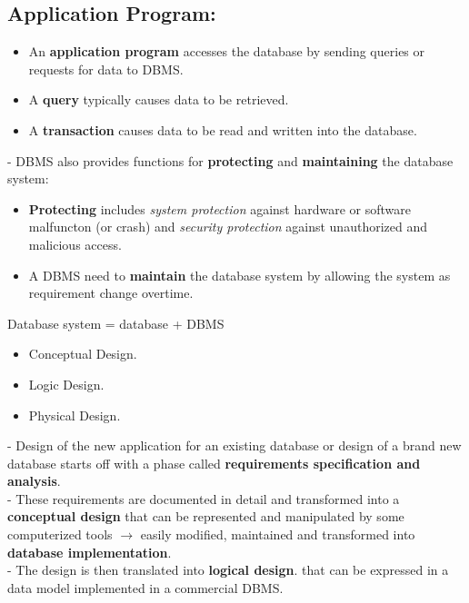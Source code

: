 \documentclass[10pt]{article}
\newcommand{\tf}{\textbf}
\newcommand{\ti}{\textit}
\begin{document}
\subsection{Application Program:}
	\begin{itemize}
		\item An \tf{application program} accesses the database by sending queries or requests for data to DBMS.
		\item A \tf{query} typically causes data to be retrieved.
		\item A \tf{transaction} causes data to be read and written into the database.
	\end{itemize}

	- DBMS also provides functions for \tf{protecting} and \tf{maintaining} the database system:
	\begin{itemize}
		\item \tf{Protecting} includes \ti{system protection} against hardware or software malfuncton (or crash) and \ti{security protection} against unauthorized and malicious access. 
		\item A DBMS need to \tf{maintain} the database system by allowing the system as requirement change overtime.
	\end{itemize}

\bigbreak
\begin{mybox}
	\begin{center}
		Database system = database + DBMS
	\end{center}
\end{mybox}
	
	\bigbreak
	\begin{itemize}
		\item Conceptual Design.
		\item Logic Design.
		\item Physical Design.
	\end{itemize}

	- Design of the new application for an existing database or design of a brand new database starts off with a phase called \tf{requirements specification and analysis}. \\

	- These requirements are documented in detail and transformed into a \tf{conceptual design} that can be represented and manipulated by some computerized tools $\rightarrow$ easily modified, maintained and transformed into \tf{database implementation}. \\

	- The design is then translated into \tf{logical design}. that can be expressed in a data model implemented in a commercial DBMS. \\
\end{document}
